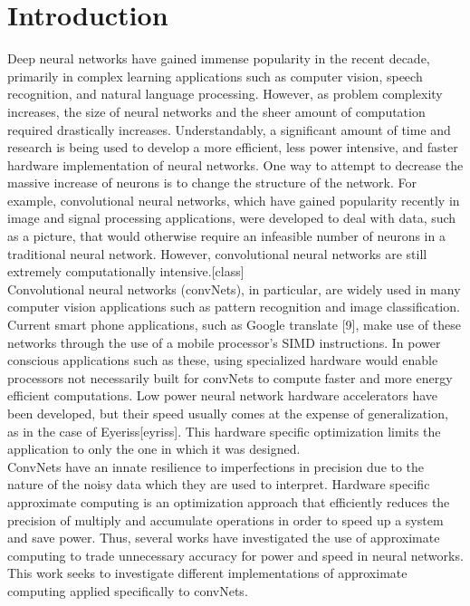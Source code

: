 \documentclass[conference]{IEEEtran}
\begin{document}
\section{Introduction}
	\indent Deep neural networks have gained immense popularity in the recent decade, primarily in complex learning applications such as computer vision, speech recognition, and natural language processing. However, as problem complexity increases, the size of neural networks and the sheer amount of computation required drastically increases. Understandably, a significant amount of time and research is being used to develop a more efficient, less power intensive, and faster hardware implementation of neural networks. One way to attempt to decrease the massive increase of neurons is to change the structure of the network. For example, convolutional neural networks, which have gained popularity recently in image and signal processing applications, were developed to deal with data, such as a picture, that would otherwise require an infeasible number of neurons in a traditional neural network. However, convolutional neural networks are still extremely computationally intensive.[class] \\
	\indent Convolutional neural networks (convNets), in particular, are widely used in many computer vision applications such as pattern recognition and image classification. Current smart phone applications, such as Google translate [9], make use of these networks through the use of a mobile processor's SIMD instructions. In power conscious applications such as these, using specialized hardware would enable processors not necessarily built for convNets to compute faster and more energy efficient computations. Low power neural network hardware accelerators have been developed, but their speed usually comes at the expense of generalization, as in the case of Eyeriss[eyriss]. This hardware specific optimization limits the application to only the one in which it was designed. \\	
	\indent ConvNets have an innate resilience to imperfections in precision due to the nature of the noisy data which they are used to interpret. Hardware specific approximate computing is an optimization approach that efficiently reduces the precision of multiply and accumulate operations in order to speed up a system and save power. Thus, several works have investigated the use of approximate computing to trade unnecessary accuracy for power and speed in neural networks. This work seeks to investigate different implementations of approximate computing applied specifically to convNets. \\
	
\end{document}
